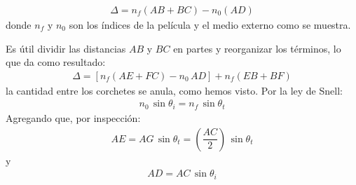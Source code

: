 \documentclass[14pt]{extarticle}
\begin{document}
\begin{align*}
\Delta = n_{f} (AB + BC) - n_{0} (AD)
\end{align*}
donde $n_{f}$ y $n_{0}$ son los índices de la película y el medio externo como se muestra.
\par
Es útil dividir las distancias $AB$ y $BC$ en partes y reorganizar los términos, lo que da como resultado:
\begin{align}
\Delta = \left[ n_{f} (AE + FC) - n_{0} \, AD\right] + n_{f} (EB + BF)
\label{eq:ecuacion_07_29}
\end{align}
la cantidad entre los corchetes se anula, como hemos visto. Por la ley de Snell:
\begin{align}
n_{0} \, \sin \theta_{i} = n_{f} \, \sin \theta_{t}
\label{eq:ecuacion_07_30}
\end{align}
Agregando que, por inspección:
\begin{align}
AE = AG \, \sin \theta_{t} = \left( \dfrac{AC}{2} \right) \, \sin \theta_{t}
\label{eq:ecuacion_07_31}
\end{align}
y
\begin{align}
AD = AC \, \sin \theta_{i}
\label{eq:ecuacion_07_32}
\end{align}
\end{document}
